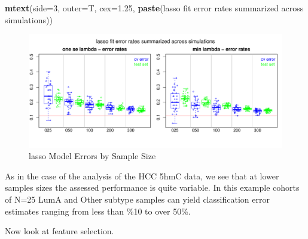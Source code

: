 \documentclass[
]{book}
\newenvironment{Shaded}{\begin{snugshade}}{\end{snugshade}}
\newcommand{\DataTypeTok}[1]{\textcolor[rgb]{0.13,0.29,0.53}{#1}}
\newcommand{\DecValTok}[1]{\textcolor[rgb]{0.00,0.00,0.81}{#1}}
\newcommand{\FloatTok}[1]{\textcolor[rgb]{0.00,0.00,0.81}{#1}}
\newcommand{\KeywordTok}[1]{\textcolor[rgb]{0.13,0.29,0.53}{\textbf{#1}}}
\newcommand{\NormalTok}[1]{#1}
\newcommand{\StringTok}[1]{\textcolor[rgb]{0.31,0.60,0.02}{#1}}
\begin{document}
\begin{Shaded}
\begin{Highlighting}[]
\KeywordTok{mtext}\NormalTok{(}\DataTypeTok{side=}\DecValTok{3}\NormalTok{, }\DataTypeTok{outer=}\NormalTok{T, }\DataTypeTok{cex=}\FloatTok{1.25}\NormalTok{, }\KeywordTok{paste}\NormalTok{(}\StringTok{\textquotesingle{}lasso fit error rates summarized across simulations\textquotesingle{}}\NormalTok{))}
\end{Highlighting}
\end{Shaded}

\begin{figure}
\centering
\includegraphics{Static/figures/brca-rnaseq-lasso-simRes-errors-overSim-1.pdf}
\caption{\label{fig:brca-rnaseq-lasso-simRes-errors-overSim}lasso Model Errors by Sample Size}
\end{figure}

As in the case of the analysis of the HCC 5hmC data, we see that at lower
samples sizes the assessed performance is quite variable.
In this example cohorts of N=25 LumA and Other subtype samples
can yield classification error estimates ranging from less than \%10
to over 50\%.

Now look at feature selection.
\end{document}
